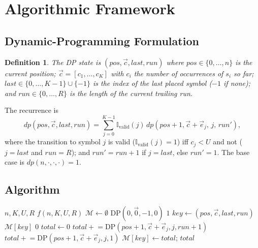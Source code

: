 \documentclass[a4paper,12pt]{article}
\newtheorem{definition}{Definition}
\begin{document}
\section{Algorithmic Framework}
\label{sec:algorithm}

\subsection{Dynamic-Programming Formulation}

\begin{definition}
The DP state is $(pos,\vec{c},last,run)$ where $pos\in\{0,\ldots,n\}$
is the current position; $\vec{c}=[c_1,\ldots,c_K]$ with $c_i$ the
number of occurrences of $s_i$ so far; $last\in\{0,\ldots,K-1\}\cup\{-1\}$
is the index of the last placed symbol ($-1$ if none); and
$run\in\{0,\ldots,R\}$ is the length of the current trailing run.
\end{definition}

The recurrence is
\begin{equation}
dp(pos,\vec{c},last,run)
  = \sum_{j=0}^{K-1}\mathbb{I}_{\mathrm{valid}}(j)\,
     dp(pos+1,\vec{c}+\vec{e}_j,\,j,\,run'),
\label{eq:dp}
\end{equation}
where the transition to symbol $j$ is valid ($\mathbb{I}_{\mathrm{valid}}(j)=1$)
iff $c_j<U$ and not ($j=last$ and $run=R$); and
$run'=run+1$ if $j=last$, else $run'=1$.  The base case is
$dp(n,\cdot,\cdot,\cdot)=1$.

\subsection{Algorithm}

\begin{algorithm}[H]
\caption{Memoised Enumeration}
\label{alg:dp}
\begin{algorithmic}[1]
\Require $n,K,U,R$
\Ensure $f(n,K,U,R)$
\State $\mathcal{M}\leftarrow\emptyset$
\State \Return $\mathrm{DP}(0,\vec{0},-1,0)$
     \Return $1$ \EndIf
    \State $key\gets(pos,\vec{c},last,run)$
     \Return $\mathcal{M}[key]$ \EndIf
     \Return $0$ \EndIf
    \State $total\gets 0$
                \State $total\mathrel{+}=\mathrm{DP}(pos+1,\vec{c}+\vec{e}_j,j,run+1)$
                \State $total\mathrel{+}=\mathrm{DP}(pos+1,\vec{c}+\vec{e}_j,j,1)$
            \EndIf
        \EndIf
    \EndFor
    \State $\mathcal{M}[key]\gets total$; \Return $total$
\EndFunction
\end{algorithmic}
\end{algorithm}
\end{document}
